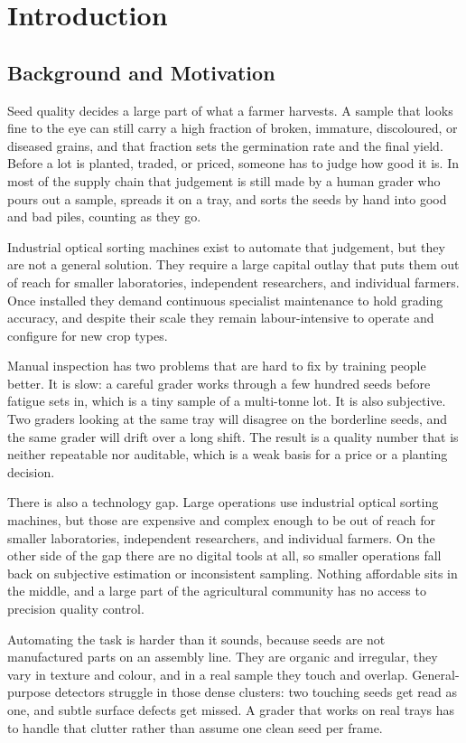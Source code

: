 \chapter{Introduction}

\section{Background and Motivation}

Seed quality decides a large part of what a farmer harvests. A sample that looks
fine to the eye can still carry a high fraction of broken, immature, discoloured,
or diseased grains, and that fraction sets the germination rate and the final
yield. Before a lot is planted, traded, or priced, someone has to judge how good
it is. In most of the supply chain that judgement is still made by a human grader
who pours out a sample, spreads it on a tray, and sorts the seeds by hand into
good and bad piles, counting as they go.

Industrial optical sorting machines exist to automate that judgement, but they
are not a general solution. They require a large capital outlay that puts them
out of reach for smaller laboratories, independent researchers, and individual
farmers. Once installed they demand continuous specialist maintenance to hold
grading accuracy, and despite their scale they remain labour-intensive to
operate and configure for new crop types.

Manual inspection has two problems that are hard to fix by training people better.
It is slow: a careful grader works through a few hundred seeds before fatigue sets
in, which is a tiny sample of a multi-tonne lot. It is also subjective. Two graders
looking at the same tray will disagree on the borderline seeds, and the same grader
will drift over a long shift. The result is a quality number that is neither
repeatable nor auditable, which is a weak basis for a price or a planting decision.

There is also a technology gap. Large operations use industrial optical sorting
machines, but those are expensive and complex enough to be out of reach for smaller
laboratories, independent researchers, and individual farmers. On the other side of
the gap there are no digital tools at all, so smaller operations fall back on
subjective estimation or inconsistent sampling. Nothing affordable sits in the
middle, and a large part of the agricultural community has no access to precision
quality control.

Automating the task is harder than it sounds, because seeds are not manufactured
parts on an assembly line. They are organic and irregular, they vary in texture and
colour, and in a real sample they touch and overlap. General-purpose detectors
struggle in those dense clusters: two touching seeds get read as one, and subtle
surface defects get missed. A grader that works on real trays has to handle that
clutter rather than assume one clean seed per frame.

